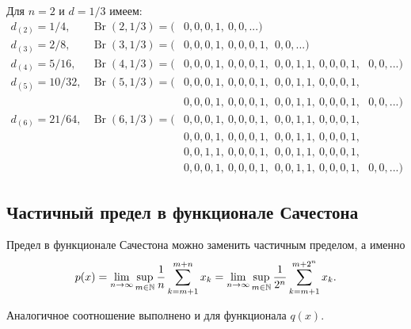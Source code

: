 \begin{example}
	Для $n=2$ и $d=1/3$ имеем:
	\begin{equation*}
		\begin{array}{lll}
			d_{(2)} = 1/4, &
			\operatorname{Br}(2,1/3) = (&0,0,0,1, \ 0,0,...)
			\\
			d_{(3)} = 2/8, &
			\operatorname{Br}(3,1/3) = (&0,0,0,1, \ 0,0,0,1, \ \   0,0,...)
			\\
			d_{(4)} = 5/16, &
			\operatorname{Br}(4,1/3) = (&0,0,0,1, \ 0,0,0,1, \ \   0,0,1,1, \ 0,0,0,1, \ \ \  0,0,...)
			\\
			d_{(5)} = 10/32, &
			\operatorname{Br}(5,1/3) = (&
			                             0,0,0,1, \ 0,0,0,1, \ \   0,0,1,1, \ 0,0,0,1,\\&
			                           & 0,0,0,1, \ 0,0,0,1, \ \   0,0,1,1, \ 0,0,0,1,
			\ \ \ 0,0,...)
			\\
			d_{(6)} = 21/64, &
			\operatorname{Br}(6,1/3) = (&
			                             0,0,0,1, \ 0,0,0,1, \ \   0,0,1,1, \ 0,0,0,1,\\&
			                           & 0,0,0,1, \ 0,0,0,1, \ \   0,0,1,1, \ 0,0,0,1,\\&
			                           & 0,0,1,1, \ 0,0,0,1, \ \   0,0,1,1, \ 0,0,0,1,\\&
			                           & 0,0,0,1, \ 0,0,0,1, \ \   0,0,1,1, \ 0,0,0,1,
			\ \ \ 0,0,...)
		\end{array}
	\end{equation*}
\end{example}

\subsection{Частичный предел в функционале Сачестона}

\begin{proposition}
	\label{prop:Sucheston_partial_limit}
	Предел в функционале Сачестона можно заменить частичным пределом, а именно
	\begin{equation*}
		p(x) = \lim_{n\to\infty} \sup_{m\in\mathbb{N}}  \frac{1}{n} \sum_{k=m+1}^{m+n} x_k
		= \lim_{n\to\infty} \sup_{m\in\mathbb{N}}  \frac{1}{2^n} \sum_{k=m+1}^{m+2^n} x_k
		.
	\end{equation*}
\end{proposition}
Аналогичное соотношение выполнено и для функционала $q(x)$.

